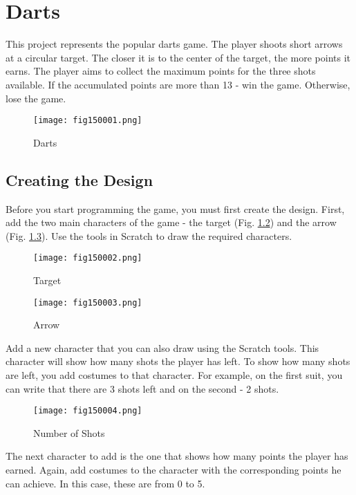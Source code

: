 \chapter{Darts}

This project represents the popular darts game. The player shoots short arrows at a circular target. The closer it is to the center of the target, the more points it earns. The player aims to collect the maximum points for the three shots available. If the accumulated points are more than 13 - win the game. Otherwise, lose the game.

\begin{figure}[H]
   \centering
   \texttt{[image: fig150001.png]}
   \caption{Darts}
\label{fig150001}
\end{figure}

\section{Creating the Design}
Before you start programming the game, you must first create the design. First, add the two main characters of the game - the target (Fig. \ref{fig150002}) and the arrow (Fig. \ref{fig150003}). Use the tools in Scratch to draw the required characters.

\begin{figure}[H]
   \centering
   \texttt{[image: fig150002.png]}
   \caption{Target}
\label{fig150002}
\end{figure}

\begin{figure}[H]
   \centering
   \texttt{[image: fig150003.png]}
   \caption{Arrow}
\label{fig150003}
\end{figure}

Add a new character that you can also draw using the Scratch tools. This character will show how many shots the player has left. To show how many shots are left, you add costumes to that character. For example, on the first suit, you can write that there are 3 shots left and on the second - 2 shots.

\begin{figure}[H]
   \centering
   \texttt{[image: fig150004.png]}
   \caption{Number of Shots}
\label{fig150004}
\end{figure}

The next character to add is the one that shows how many points the player has earned. Again, add costumes to the character with the corresponding points he can achieve. In this case, these are from 0 to 5.


